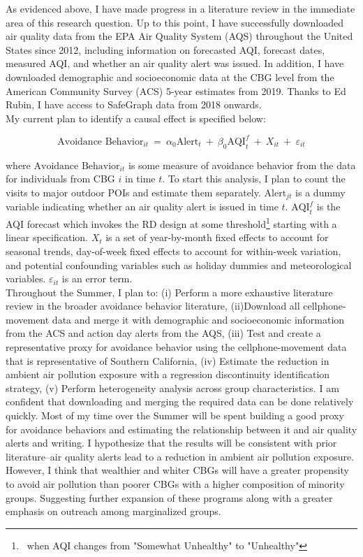\documentclass[12pt]{article}
\begin{document}
As evidenced above, I have made progress in a literature review in the immediate area of this research question. Up to this point, I have successfully downloaded air quality data from the EPA Air Quality System (AQS) throughout the United States since 2012, including information on forecasted AQI, forecast dates, measured AQI, and whether an air quality alert was issued. In addition, I have downloaded demographic and socioeconomic data at the CBG level from the American Community Survey (ACS) 5-year estimates from 2019. Thanks to Ed Rubin, I have access to SafeGraph data from 2018 onwards. \\

\noindent My current plan to identify a causal effect is specified below:

\begin{equation*}
\text{Avoidance Behavior}_{it} ~=~ \alpha_0 \text{Alert}_{t} ~+~ \beta_{0} \text{AQI}^{f}_{t} ~+~ X_{it} ~+~ \varepsilon_{it}
\end{equation*}

\noindent where $\text{Avoidance Behavior}_{it}$ is some measure of avoidance behavior from the data for individuals from CBG $i$ in time $t$. To start this analysis, I plan to count the visits to major outdoor POIs and estimate them separately. $\text{Alert}_{jt}$ is a dummy variable indicating whether an air quality alert is issued in time $t$. $\text{AQI}^{f}_{t}$ is the AQI forecast which invokes the RD design at some threshold\footnote{~when AQI changes from "Somewhat Unhealthy" to "Unhealthy"} starting with a linear specification. $X_t$ is a set of year-by-month fixed effects to account for seasonal trends, day-of-week fixed effects to account for within-week variation, and potential confounding variables such as holiday dummies and meteorological variables. $\varepsilon_{it}$ is an error term.  \\

Throughout the Summer, I plan to:
(i) Perform a more exhaustive literature review in the broader avoidance behavior literature, 
(ii)Download all cellphone-movement data and merge it with demographic and socioeconomic information from the ACS and action day alerts from the AQS,
(iii) Test and create a representative proxy for avoidance behavior using the cellphone-movement data that is representative of Southern California,
(iv) Estimate the reduction in ambient air pollution exposure with a regression discontinuity identification strategy,
(v) Perform heterogeneity analysis across group characteristics.
I am confident that downloading and merging the required data can be done relatively quickly. Most of my time over the Summer will be spent building a good proxy for avoidance behaviors and estimating the relationship between it and air quality alerts and writing. I hypothesize that the results will be consistent with prior literature--air quality alerts lead to a reduction in ambient air pollution exposure. However, I think that wealthier and whiter CBGs will have a greater propensity to avoid air pollution than poorer CBGs with a higher composition of minority groups. Suggesting further expansion of these programs along with a greater emphasis on outreach among marginalized groups.
\end{document}
